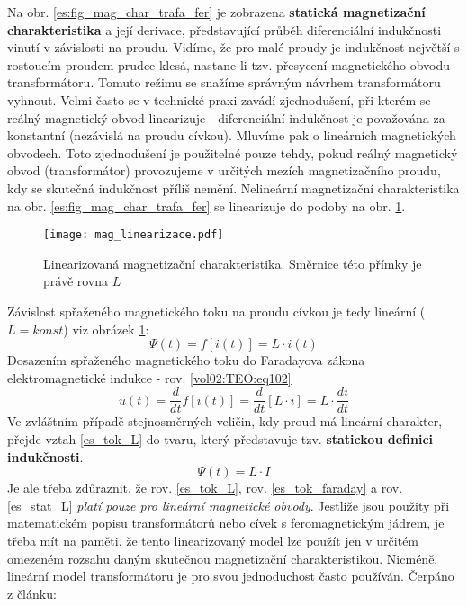     Na obr. \ref{es:fig_mag_char_trafa_fer} je zobrazena \textbf{statická magnetizační 
    charakteristika} a její derivace, představující průběh diferenciální indukčnosti vinutí v 
    závislosti na proudu. Vidíme, že pro malé proudy je indukčnost největší s rostoucím proudem 
    prudce klesá, nastane-li tzv. přesycení magnetického obvodu transformátoru. Tomuto režimu se 
    snažíme správným návrhem transformátoru vyhnout. Velmi často se v technické praxi zavádí 
    zjednodušení, při kterém se reálný magnetický obvod linearizuje - diferenciální indukčnost je 
    považována za konstantní (nezávislá na proudu cívkou). Mluvíme pak o lineárních magnetických 
    obvodech. Toto zjednodušení je použitelné pouze tehdy, pokud reálný magnetický obvod 
    (transformátor) provozujeme v určitých mezích magnetizačního proudu, kdy se skutečná indukčnost
    příliš nemění. Nelineární magnetizační charakteristika na obr. \ref{es:fig_mag_char_trafa_fer} 
    se linearizuje do podoby na obr. \ref{figure:mag_lin}.

    \begin{figure}[ht!]   %
      \centering
      \texttt{[image: mag\_linearizace.pdf]}
      \caption{Linearizovaná magnetizační charakteristika. Směrnice této přímky je právě rovna $L$}
      \label{figure:mag_lin}
    \end{figure}
    Závislost spřaženého magnetického toku na proudu cívkou je tedy lineární ($L=konst$) viz obrázek
    \ref{figure:mag_lin}:
    \begin{equation}\label{es_tok_L}
      \Psi(t)=f[i(t)] = L \cdot i(t)
    \end{equation}    
    Dosazením spřaženého magnetického toku do Faradayova zákona elektromagnetické indukce - rov.
    \ref{vol02:TEO:eq102}
    \begin{equation}\label{es_tok_faraday}
        u(t)=\frac{d}{dt}f[i(t)]=\frac{d}{dt}[L\cdot i]=L\cdot\frac{di}{dt}
    \end{equation}
    Ve zvláštním případě stejnosměrných veličin, kdy proud má lineární charakter, přejde vztah
    \ref{es_tok_L} do tvaru, který představuje tzv. \textbf{statickou definici indukčnosti}.
    \begin{equation}\label{es_stat_L}
      \Psi(t)= L \cdot I
    \end{equation}
    Je ale třeba zdůraznit, že rov. \ref{es_tok_L}, rov. \ref{es_tok_faraday} a rov. 
    \ref{es_stat_L} \emph{platí pouze pro lineární magnetické obvody}. Jestliže jsou použity při 
    matematickém popisu transformátorů nebo cívek s feromagnetickým jádrem, je třeba mít na paměti, 
    že tento linearizovaný model lze použít jen v určitém omezeném rozsahu daným skutečnou 
    magnetizační charakteristikou. Nicméně, lineární model transformátoru je pro svou jednoduchost 
    často používán. Čerpáno z článku: \librarianTrafoModel
    
